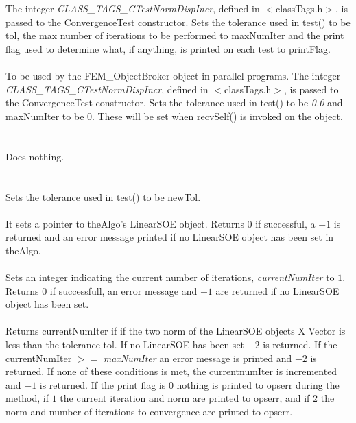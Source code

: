   \\
  \\
The integer {\em CLASS\_TAGS\_CTestNormDispIncr}, defined in
$<$classTags.h$>$, is passed to the ConvergenceTest constructor. Sets
the tolerance used in test() to be \p tol, the max number
of iterations to be performed to \p maxNumIter and the print
flag used to determine what, if anything, is printed on each test to
\p printFlag. \\


  \\
To be used by the FEM\_ObjectBroker object in parallel programs. The
integer {\em CLASS\_TAGS\_CTestNormDispIncr}, defined in
$<$classTags.h$>$, is passed to the ConvergenceTest constructor. Sets
the tolerance used in test() to be {\em 0.0} and \p maxNumIter 
to be $0$. These will be set when recvSelf() is invoked on the object. \\


 \\
 \\ 
Does nothing. \\

  \\
 \\
Sets the tolerance used in test() to be \p newTol. \\

 \\
It sets a pointer to \p theAlgo's LinearSOE object. Returns $0$ if
successful, a $-1$ is returned and an error message printed if no
LinearSOE object has been set in \p theAlgo. \\

 \\
Sets an integer indicating the current number of iterations, {\em
currentNumIter} to $1$. Returns $0$ if successfull, an error message
and $-1$ are returned if no LinearSOE object has been set. \\

 \\
Returns {currentNumIter} if if the two norm of the LinearSOE objects X
Vector is less than the tolerance \p tol. If no LinearSOE has been
set $-2$ is returned. If the \p currentNumIter $>=$ {\em
maxNumIter} an error message is printed and $-2$ is returned. If none
of these conditions is met, the \p currentnumIter is incremented
and $-1$ is returned. If the print flag is $0$ nothing is printed to
opserr during the method, if $1$ the current iteration and norm are
printed to opserr, and if $2$ the norm and number of iterations to convergence
are printed to opserr. \\ 


